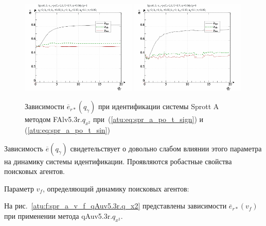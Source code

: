\begin{figure}[h!]
  \centerline{
    \includegraphics[width=0.49\textwidth]{p/cha/spr_a/FAlv5.3A/sprott_a_FAlv5x3r-p_qg_e_sign.png}
    \hfill
    \includegraphics[width=0.49\textwidth]{p/cha/spr_a/FAlv5.3A/sprott_a_FAlv5x3r-p_qg_e_sin.png}
  }
  \caption{Зависимости $\overline{e}_{r*}(q_\gamma)$ при идентификации системы Sprott A методом FAlv5.3r.$q_{x^2}$
   при~(\ref{atu:eq:spr_a_po_t_sign}) и (\ref{atu:eq:spr_a_po_t_sin})}
  \label{atu:f:spr_a_qg_FAlv5.3r.q_x2}
\end{figure}

Зависимость $\overline{e}( q_\gamma )$ %
свидетельствует о довольно слабом влиянии этого параметра
на динамику системы идентификации.
Проявляются робастные свойства поисковых агентов.



Параметр $v_f$, определяющий динамику поисковых агентов:


На рис.~\ref{atu:f:spr_a_v_f_qAuv5.3r.q_x2} представлены зависимости
$\overline{e}_{r*}(v_f)$ при применении метода qAuv5.3r.$q_{x^2}$.

